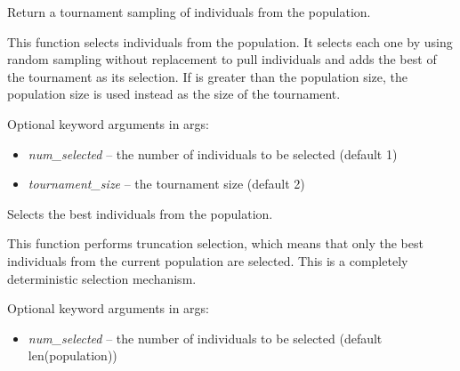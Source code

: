 \documentclass[letterpaper,10pt,english]{sphinxmanual}
\begin{document}

\begin{fulllineitems}
\label{reference:inspyred.ec.selectors.tournament_selection}
Return a tournament sampling of individuals from the population.

This function selects  individuals from the population. 
It selects each one by using random sampling without replacement
to pull  individuals and adds the best of the
tournament as its selection. If  is greater than
the population size, the population size is used instead as the size
of the tournament.

Optional keyword arguments in args:
\begin{itemize}
\item {} 
\emph{num\_selected} -- the number of individuals to be selected (default 1)

\item {} 
\emph{tournament\_size} -- the tournament size (default 2)

\end{itemize}

\end{fulllineitems}


\begin{fulllineitems}
\label{reference:inspyred.ec.selectors.truncation_selection}
Selects the best individuals from the population.

This function performs truncation selection, which means that only
the best individuals from the current population are selected. This
is a completely deterministic selection mechanism.

Optional keyword arguments in args:
\begin{itemize}
\item {} 
\emph{num\_selected} -- the number of individuals to be selected 
(default len(population))

\end{itemize}

\end{fulllineitems}
\end{document}
